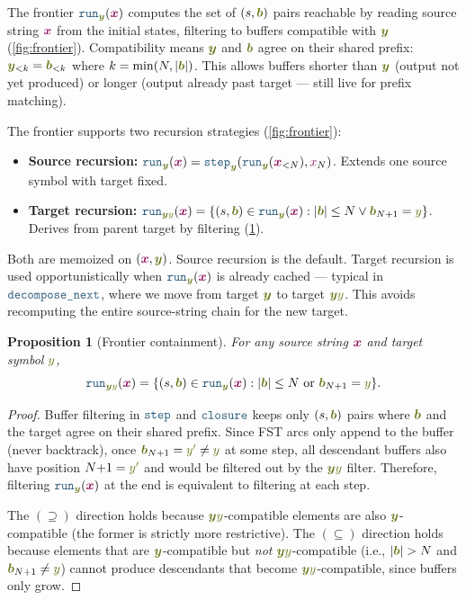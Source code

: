 \documentclass{article}
\theoremstyle{plain}
\newtheorem{proposition}[theorem]{Proposition}
\newcommand{\mymacro}[1]{#1}
\newcommand{\srcSym}{{\color{TokenColor}x}}
\newcommand{\srcStr}{\ensuremath{{\color{TokenColor}\boldsymbol{x}}}\xspace}
\newcommand{\tgtSym}{{\color{CharacterColor}y}}
\newcommand{\tgtSymp}{{\color{CharacterColor}y^\prime}}
\newcommand{\tgtStr}{{\color{CharacterColor}\boldsymbol{y}}}
\newcommand{\state}{\mymacro{s}}
\newcommand{\buffer}{{\color{CharacterColor}\boldsymbol{b}}}
\newcommand{\myMintedFunc}[1]{\mbox{\texttt{{\color{StormBlue}#1}}}}
\newcommand{\runFrontier}[0]{\myMintedFunc{run}}
\newcommand{\nextFrontier}[0]{\myMintedFunc{step}}
\newcommand{\closureFrontier}[0]{\myMintedFunc{closure}}
\newcommand{\decomposeNext}[0]{\myMintedFunc{decompose\_next}}
\begin{document}
The frontier $\runFrontier_\tgtStr(\srcStr)$ computes the set of $(\state,
\buffer)$ pairs reachable by reading source string $\srcStr$ from the initial
states, filtering to buffers compatible with $\tgtStr$ (\cref{fig:frontier}).
Compatibility means $\tgtStr$ and $\buffer$ agree on their shared prefix:
$\tgtStr_{<k} = \buffer_{<k}$ where $k = \min(N, |\buffer|)$.
This allows buffers shorter than $\tgtStr$ (output not yet produced) or longer
(output already past target --- still live for prefix matching).

The frontier supports two recursion strategies (\cref{fig:frontier}):
\begin{itemize}
\item \textbf{Source recursion:}
  $\runFrontier_\tgtStr(\srcStr) =
  \nextFrontier_\tgtStr(\runFrontier_\tgtStr(\srcStr_{<N}), \srcSym_N)$.
  Extends one source symbol with target fixed.
\item \textbf{Target recursion:}
  $\runFrontier_{\tgtStr\tgtSym}(\srcStr) =
  \{(\state, \buffer) \in \runFrontier_\tgtStr(\srcStr) :
  |\buffer| \le N \lor \buffer_{N+1} = \tgtSym\}$.
  Derives from parent target by filtering
  (\cref{prop:frontier-containment}).
\end{itemize}
Both are memoized on $(\srcStr, \tgtStr)$.  Source recursion is the default.
Target recursion is used opportunistically when
$\runFrontier_\tgtStr(\srcStr)$ is already cached --- typical in
$\decomposeNext$, where we move from target $\tgtStr$ to target
$\tgtStr\tgtSym$.  This avoids recomputing the entire source-string chain for
the new target.

\begin{proposition}[Frontier containment]
\label{prop:frontier-containment}
For any source string $\srcStr$ and target symbol $\tgtSym$,
\[
\runFrontier_{\tgtStr\tgtSym}(\srcStr) = \{(\state, \buffer) \in
\runFrontier_\tgtStr(\srcStr) : |\buffer| \le N \text{ or } \buffer_{N+1} =
\tgtSym\}.
\]
\end{proposition}
\begin{proof}
Buffer filtering in $\nextFrontier$ and $\closureFrontier$ keeps only
$(\state, \buffer)$ pairs where $\buffer$ and the target agree on their shared
prefix.
Since FST arcs only append to the buffer (never backtrack), once
$\buffer_{N+1} = \tgtSymp \ne \tgtSym$ at some step, all descendant buffers
also have position $N{+}1 = \tgtSymp$ and would be filtered out by the
$\tgtStr\tgtSym$ filter.
Therefore, filtering $\runFrontier_\tgtStr(\srcStr)$ at the end is equivalent
to filtering at each step.

The $(\supseteq)$ direction holds because $\tgtStr\tgtSym$-compatible elements
are also $\tgtStr$-compatible (the former is strictly more restrictive).
The $(\subseteq)$ direction holds because elements that are
$\tgtStr$-compatible but \emph{not} $\tgtStr\tgtSym$-compatible (i.e.,
$|\buffer| > N$ and $\buffer_{N+1} \ne \tgtSym$) cannot produce descendants
that become $\tgtStr\tgtSym$-compatible, since buffers only grow.
\end{proof}
\end{document}
